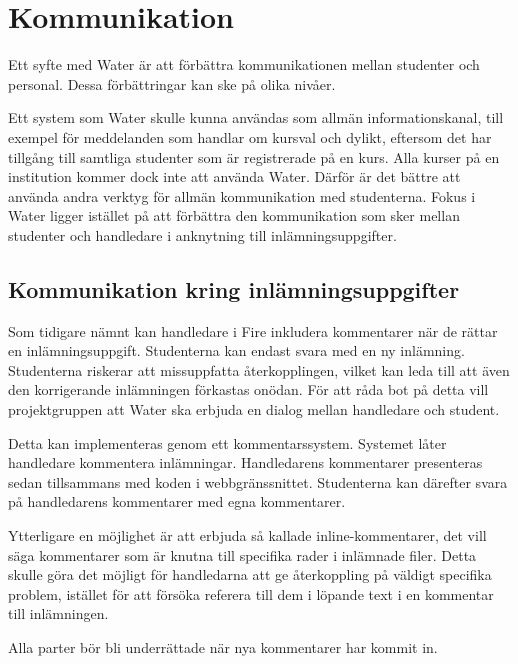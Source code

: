 \section{Kommunikation}

Ett syfte med Water är att förbättra kommunikationen mellan studenter och personal. Dessa förbättringar kan ske på olika nivåer.

Ett system som Water skulle kunna användas som allmän informationskanal, till exempel för meddelanden som handlar om kursval och dylikt,  eftersom det har tillgång till samtliga studenter som är registrerade på en kurs. Alla kurser på en institution kommer dock inte att använda Water. Därför är det bättre att använda andra verktyg för allmän kommunikation med studenterna. Fokus i Water ligger istället på att förbättra den kommunikation som sker mellan studenter och handledare i anknytning till inlämningsuppgifter.

\subsection{Kommunikation kring inlämningsuppgifter}
Som tidigare nämnt kan handledare i Fire inkludera kommentarer när de rättar en inlämningsuppgift. Studenterna kan endast svara med en ny inlämning. Studenterna riskerar att missuppfatta återkopplingen, vilket kan leda till att även den korrigerande inlämningen förkastas onödan. För att råda bot på detta vill projektgruppen att Water  ska erbjuda en dialog mellan handledare och student.

Detta kan implementeras genom ett kommentarssystem. Systemet låter handledare kommentera inlämningar. Handledarens kommentarer presenteras sedan tillsammans med koden i webbgränssnittet. Studenterna kan därefter svara på handledarens kommentarer med egna kommentarer.

Ytterligare en möjlighet är att erbjuda så kallade inline-kommentarer, det vill säga kommentarer som är knutna till specifika rader i inlämnade filer. Detta skulle göra det möjligt för handledarna att ge återkoppling på väldigt specifika problem, istället för att försöka referera till dem i löpande text i en kommentar till inlämningen.

Alla parter bör bli underrättade när nya kommentarer har kommit in.
